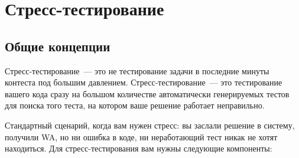 \chapter{Стресс-тестирование} \label{stresssection}

\section{Общие концепции}

Стресс-тестирование~--- это не тестирование задачи в последние минуты контеста под большим давлением.
Стресс-тестирование~--- это тестирование вашего кода сразу на большом количестве автоматически генерируемых тестов для поиска того теста, на котором ваше решение работает неправильно.

Стандартный сценарий, когда вам нужен стресс: вы заслали решение в систему, получили WA, но ни ошибка в коде, ни неработающий тест никак не хотят находиться. Для стресс-тестирования вам нужны следующие компоненты:

